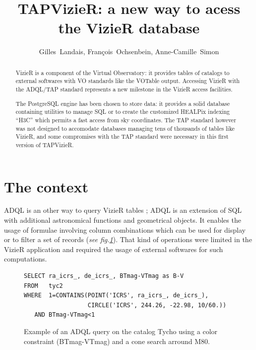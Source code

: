 
\resetcounters



\resetcounters

\title{TAPVizieR: a new way to acess the VizieR database}
\author{Gilles~Landais, Fran\c cois~Ochsenbein, Anne-Camille~Simon
}


\begin{abstract}
VizieR is a component of the Virtual Observatory: it provides tables of
catalogs to external softwares with VO standards like the VOTable output.
Accessing VizieR with the ADQL/TAP standard represents a new milestone
in the VizieR access facilities.

The PostgreSQL engine has been chosen to store data: it provides a solid
database containing utilities to manage SQL or to create the customized
HEALPix indexing ``H3C'' which permits a fast access from sky coordinates.
The TAP standard however was not designed to accomodate databases
managing tens of thousands of tables like VizieR, and some compromises
with the TAP standard were necessary in this first version of TAPVizieR.
\end{abstract}

\section{The context}

ADQL \citep{adql_2011} is an other way to query VizieR tables 
\citep{ochsenbein_2000}; ADQL is an extension of SQL 
with additional astronomical functions and geometrical objects. 
It enables the usage of formulae involving column combinations which can be used 
for display or to filter a set of records (\textit{see fig.\ref{P044:ADQLexample}}). 
That kind of operations were limited in the VizieR application and required 
the usage of external softwares for such computations.

\begin{figure}[!h] \center
\begin{footnotesize}
\begin{verbatim}
SELECT ra_icrs_, de_icrs_, BTmag-VTmag as B-V
FROM   tyc2
WHERE  1=CONTAINS(POINT('ICRS', ra_icrs_, de_icrs_),
                  CIRCLE('ICRS', 244.26, -22.98, 10/60.))
   AND BTmag-VTmag<1
\end{verbatim}\end{footnotesize}
\caption{Example of an ADQL query on the catalog Tycho using a color 
constraint (BTmag-VTmag) and a cone search arround M80.}\label{P044:ADQLexample}
\end{figure}

